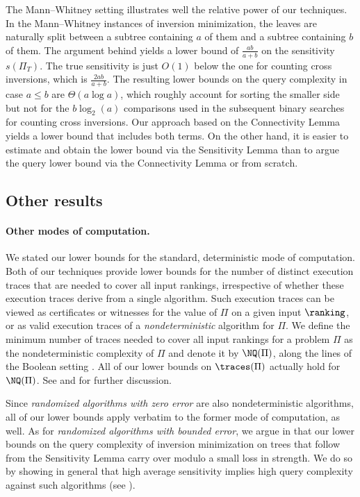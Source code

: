 \documentclass{toc}
\begin{document}
The Mann--Whitney setting illustrates well the relative power of our techniques. In the Mann--Whitney instances of inversion minimization, the leaves are naturally split between a subtree containing $a$ of them and a subtree containing $b$ of them. The argument behind  yields a lower bound of $\frac{ab}{a+b}$ on the sensitivity $s(\Pi_T)$. The true sensitivity is just $O(1)$ below the one for counting cross inversions, which is $\frac{2ab}{a+b}$. The resulting lower bounds on the query complexity in case $a \le b$ are $\Theta(a \log a)$, which roughly account for sorting the smaller side but not for the $b \log_2(a)$ comparisons used in the subsequent binary searches for counting cross inversions. Our approach based on the Connectivity Lemma yields a lower bound that includes both terms. On the other hand, it is easier to estimate and obtain the lower bound via the Sensitivity Lemma than to argue the query lower bound via the Connectivity Lemma or from scratch. 

\subsection{Other results}
%

\paragraph{Other modes of computation.}
We stated our lower bounds for the standard, deterministic mode of computation. Both of our techniques provide lower bounds for the number of distinct execution traces that are needed to cover all input rankings, irrespective of whether these execution traces derive from a single algorithm. Such execution traces can be viewed as certificates or witnesses for the value of $\Pi$ on a given input $\ranking$, or as valid execution traces of a \emph{nondeterministic} algorithm for $\Pi$. We define the minimum number of traces needed to cover all input rankings for a problem $\Pi$ as the nondeterministic complexity of $\Pi$ and denote it by $\NQ(\Pi)$, along the lines of the Boolean setting \cite{JRSW99}. All of our lower bounds on $\traces(\Pi)$ actually hold for $\NQ(\Pi)$. See  and  for further discussion.

Since \emph{randomized algorithms with zero error} are also nondeterministic algorithms, all of our lower bounds apply verbatim to the former mode of computation, as well. As for \emph{randomized algorithms with bounded error}, we argue in  that our lower bounds on the query complexity of inversion minimization on trees that follow from the Sensitivity Lemma carry over modulo a small loss in strength. We do so by showing in general %
%
%
that high average sensitivity implies high query complexity against such algorithms (see ).
\end{document}
